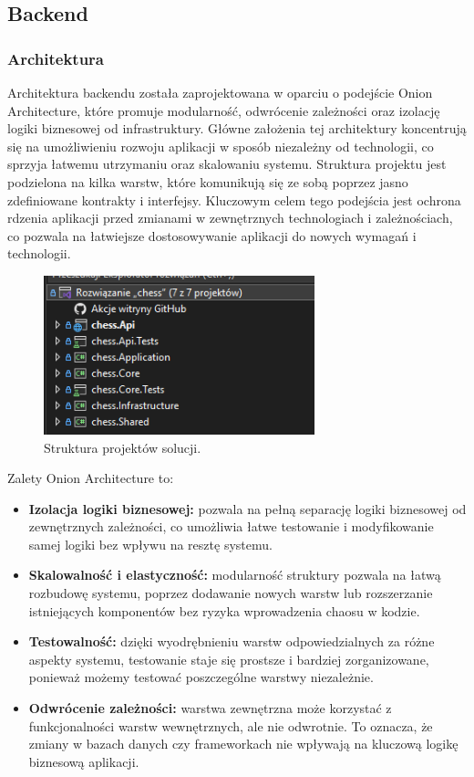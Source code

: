 \documentclass[12pt,a4paper]{article}
\begin{document}
\newpage
\subsection{Backend} 
\subsubsection{Architektura} 
Architektura backendu została zaprojektowana w oparciu o podejście Onion Architecture, które promuje modularność, odwrócenie zależności oraz izolację logiki biznesowej od infrastruktury. Główne założenia tej architektury koncentrują się na umożliwieniu rozwoju aplikacji w sposób niezależny od technologii, co sprzyja łatwemu utrzymaniu oraz skalowaniu systemu. Struktura projektu jest podzielona na kilka warstw, które komunikują się ze sobą poprzez jasno zdefiniowane kontrakty i interfejsy. Kluczowym celem tego podejścia jest ochrona rdzenia aplikacji przed zmianami w zewnętrznych technologiach i zależnościach, co pozwala na łatwiejsze dostosowywanie aplikacji do nowych wymagań i technologii.


\begin{figure}[h!] 
    \centering 
    \includegraphics[width=0.7\textwidth]{zdj/struktura_back.png} 
    \caption{Struktura projektów solucji.} 
\end{figure}

Zalety Onion Architecture to:
\begin{itemize}
    \item \textbf{Izolacja logiki biznesowej:} pozwala na pełną separację logiki biznesowej od zewnętrznych zależności, co umożliwia łatwe testowanie i modyfikowanie samej logiki bez wpływu na resztę systemu.
    \item \textbf{Skalowalność i elastyczność:} modularność struktury pozwala na łatwą rozbudowę systemu, poprzez dodawanie nowych warstw lub rozszerzanie istniejących komponentów bez ryzyka wprowadzenia chaosu w kodzie.
    \item \textbf{Testowalność:} dzięki wyodrębnieniu warstw odpowiedzialnych za różne aspekty systemu, testowanie staje się prostsze i bardziej zorganizowane, ponieważ możemy testować poszczególne warstwy niezależnie.
    \item \textbf{Odwrócenie zależności:} warstwa zewnętrzna może korzystać z funkcjonalności warstw wewnętrznych, ale nie odwrotnie. To oznacza, że zmiany w bazach danych czy frameworkach nie wpływają na kluczową logikę biznesową aplikacji.
\end{itemize}
\end{document}
